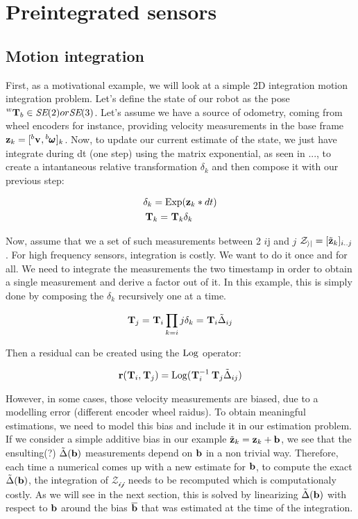\chapter{Preintegrated sensors}
\minitoc

\section{Motion integration}
First, as a motivational example, we will look at a simple 2D integration motion integration problem. 
Let's define the state of our robot as the pose $\prescript{w}{}{{\bf T}}_{b} \in \textit{SE} (2) or \textit{SE}(3)$. 
Let's assume we have a source of odometry, coming from wheel encoders for instance, providing velocity measurements in the base frame 
${\bf z}_k = [\prescript{b}{}{{\bf v}}_{}, \prescript{b}{}{\pmb{\omega}}_{}]_k$. Now, to update our current estimate of the state, we just have integrate during dt (one step) 
using the matrix exponential, as seen in ..., to create a intantaneous relative transformation $\delta_k$ and then compose it with our previous step:

\begin{equation}
    \begin{split}
        &\delta_k = \operatorname*{Exp}({\bf z}_k * dt) 
        \\
        &\prescript{}{}{{\bf T}}_{k} = \prescript{}{}{{\bf T}}_{k} \delta_k
    \end{split}
\end{equation}

Now, assume that we a set of such measurements between 2 \KFs $i$j and $j$ $\mathcal{Z_{ij}} = [\tilde{{\bf z}}_k]_{i..j}$. 
For high frequency sensors, integration is costly. We want to do it once and for all.
We need to integrate the measurements the two \KFs timestamp in order to obtain a single measurement and derive a factor out of it.
In this example, this is simply done by composing the $\delta_k$ recursively one at a time.

\begin{equation}
    \prescript{}{}{{\bf T}}_{j} = \prescript{}{}{{\bf T}}_{i} \prod_{k=i}{j}\delta_k = \prescript{}{}{{\bf T}}_{i} \tilde\Delta_{ij}
\end{equation}

Then a residual can be created using the $\operatorname*{Log}$ operator:

\begin{equation}
    {\bf r}(\prescript{}{}{{\bf T}}_{i}, \prescript{}{}{{\bf T}}_{j}) = \operatorname*{Log}(\prescript{}{}{{\bf T}}_{i}^{-1}\prescript{}{}{{\bf T}}_{j} \tilde\Delta_{ij})
\end{equation}

However, in some cases, those velocity measurements are biased, due to a modelling error (different encoder wheel raidus). 
To obtain meaningful estimations, we need to model this bias and include it in our estimation problem. If we consider a simple additive bias in our example
$\tilde{{\bf z}}_k = {\bf z}_k + {\bf b}$, we see that the ensulting(?) $\tilde\Delta({\bf b})$ measurements depend on ${\bf b}$ in a non trivial way. Therefore,
each time a numerical comes up with a new estimate for ${\bf b}$, to compute the exact $\tilde\Delta({\bf b})$, the integration of $\mathcal{Z_{ij}}$ 
needs to be recomputed which is computationaly costly. As we will see in the next section, this is solved by linearizing $\tilde\Delta({\bf b})$ with respect to ${\bf b}$ around
the bias $\overline{{\bf b}}$ that was estimated at the time of the integration. 

